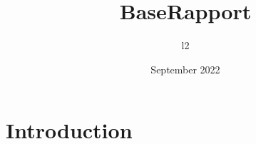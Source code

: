 \documentclass{article}
\title{BaseRapport}
\author{l2 }
\date{September 2022}
\begin{document}
\maketitle

\section{Introduction}
\end{document}
